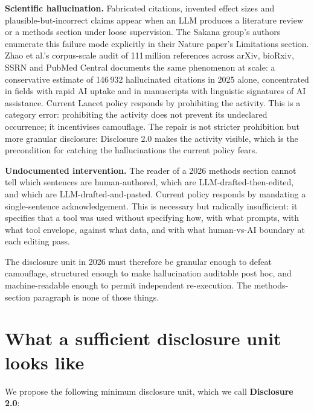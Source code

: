\documentclass[11pt,a4paper]{article}
\begin{document}
\textbf{Scientific hallucination.} Fabricated citations, invented effect sizes and plausible-but-incorrect claims appear when an LLM produces a literature review or a methods section under loose supervision. The Sakana group's authors enumerate this failure mode explicitly in their Nature paper's Limitations section\citep{luSakana2026}. Zhao et al.'s corpus-scale audit of 111\,million references across arXiv, bioRxiv, SSRN and PubMed Central documents the same phenomenon at scale: a conservative estimate of 146\,932 hallucinated citations in 2025 alone, concentrated in fields with rapid AI uptake and in manuscripts with linguistic signatures of AI assistance\citep{zhaoHallucinations2026}. Current Lancet policy responds by prohibiting the activity. This is a category error: prohibiting the activity does not prevent its undeclared occurrence; it incentivises camouflage. The repair is not stricter prohibition but more granular disclosure: Disclosure 2.0 makes the activity visible, which is the precondition for catching the hallucinations the current policy fears.

\textbf{Undocumented intervention.} The reader of a 2026 methods section cannot tell which sentences are human-authored, which are LLM-drafted-then-edited, and which are LLM-drafted-and-pasted. Current policy responds by mandating a single-sentence acknowledgement. This is necessary but radically insufficient: it specifies that a tool was used without specifying how, with what prompts, with what tool envelope, against what data, and with what human-vs-AI boundary at each editing pass.

The disclosure unit in 2026 must therefore be granular enough to defeat camouflage, structured enough to make hallucination auditable post hoc, and machine-readable enough to permit independent re-execution. The methods-section paragraph is none of those things.

\section{What a sufficient disclosure unit looks like}\label{sec:unit}

We propose the following minimum disclosure unit, which we call \textbf{Disclosure 2.0}:
\end{document}
